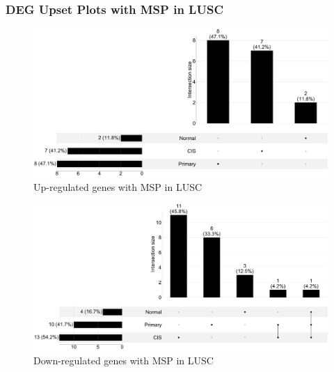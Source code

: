 \documentclass{beamer}
\begin{document}
    \begin{frame}[allowframebreaks]
        \frametitle{DEG Upset Plots with MSP in LUSC}

        \begin{figure}
            \includegraphics[width=0.8 \linewidth]{figures/DEG/Pair-Venn/STAR.FPKM.SQC.MSP-Median.Up.venn.pdf}
            \caption{Up-regulated genes with MSP in LUSC}
        \end{figure}

        \begin{figure}
            \includegraphics[width=0.8 \linewidth]{figures/DEG/Pair-Venn/STAR.FPKM.SQC.MSP-Median.Down.venn.pdf}
            \caption{Down-regulated genes with MSP in LUSC}
        \end{figure}
    \end{frame}
\end{document}
